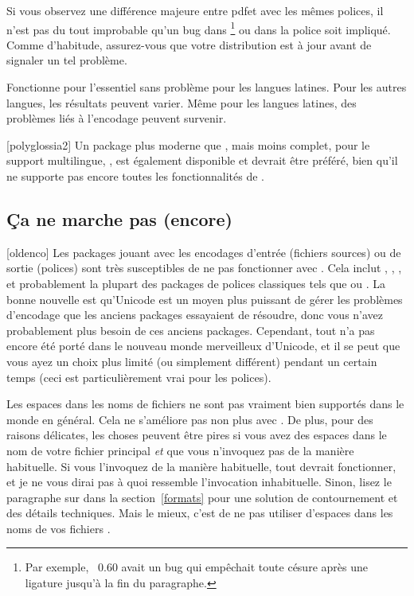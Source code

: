 \documentclass{lltxdoc}
\begin{document}
Si vous observez une différence majeure entre pdf\latex et \lualatex avec les
mêmes polices, il n'est pas du tout improbable qu'un bug dans \luatex\footnote{Par
  exemple, \luatex{}~0.60 avait un bug qui empêchait toute césure après une ligature
  \code{-{}-{}-} jusqu'à la fin du paragraphe.} ou dans la police soit impliqué.
Comme d'habitude, assurez-vous que votre distribution est à jour avant de signaler
un tel problème.

Fonctionne pour l'essentiel sans problème pour les langues latines. Pour les
autres langues, les résultats peuvent varier. Même pour les langues latines,
des problèmes liés à l'encodage peuvent survenir.

[polyglossia2]
Un package plus moderne que , mais moins complet, pour le support
multilingue, , est également disponible et devrait être préféré,
bien qu'il ne supporte pas encore toutes les fonctionnalités de .

\subsection{Ça ne marche pas (encore)}\label{notworking}

[oldenco] Les packages jouant avec les encodages d'entrée
(fichiers sources) ou de sortie (polices) sont très susceptibles de ne pas fonctionner
avec \luatex. Cela inclut , , , et probablement
la plupart des packages de polices classiques tels que  ou .
La bonne nouvelle est qu'Unicode est un moyen plus puissant de gérer les problèmes
d'encodage que les anciens packages essayaient de résoudre, donc vous n'avez probablement
plus besoin de ces anciens packages. Cependant, tout n'a pas encore été porté
dans le nouveau monde merveilleux d'Unicode, et il se peut que vous ayez un choix
plus limité (ou simplement différent) pendant un certain temps (ceci est particulièrement
vrai pour les polices).

 Les espaces dans les noms de fichiers ne sont pas vraiment
bien supportés dans le monde \tex en général. Cela ne s'améliore pas non plus
avec \luatex. De plus, pour des raisons délicates, les choses peuvent être pires
si vous avez des espaces dans le nom de votre fichier \tex principal \emph{et}
que vous n'invoquez pas \luatex de la manière habituelle. Si vous l'invoquez
de la manière habituelle, tout devrait fonctionner, et je ne vous dirai pas
à quoi ressemble l'invocation inhabituelle. Sinon, lisez le paragraphe sur
 dans la section~\ref{formats} pour une solution de contournement
et des détails techniques. Mais le mieux, c'est de ne pas utiliser d'espaces
dans les noms de vos fichiers \tex.
\end{document}
